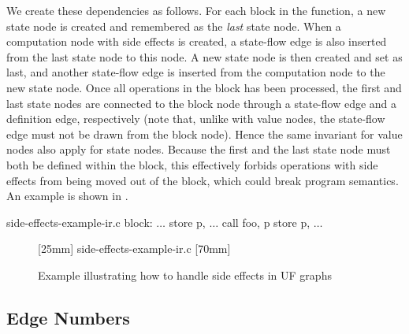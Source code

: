 We create these dependencies as follows.
%
For each \gls{block} in the \gls{function}, a new \gls{state node} is created
and remembered as the \emph{last} \gls{state node}.
%
When a \gls{computation node} with side effects is created, a \gls{state-flow
  edge} is also inserted from the last \gls{state node} to this \gls{node}.
%
A new \gls{state node} is then created and set as last, and another
\gls{state-flow edge} is inserted from the \gls{computation node} to the new
\gls{state node}.
%
Once all \glspl{operation} in the \gls{block} has been processed, the first and
last \glspl{state node} are connected to the \gls{block node} through a
\gls{state-flow edge} and a \gls{definition edge}, respectively (note that,
unlike with \glspl{value node}, the \gls{state-flow edge} must not be drawn from
the  \gls{block node}).
%
Hence the same invariant for \glspl{value node} also apply for \glspl{state
  node}.
%
Because the first and the last \gls{state node} must both be defined within the
\gls{block}, this effectively forbids \glspl{operation} with side effects from
being moved out of the \gls{block}, which could break \gls{program} semantics.
%
An example is shown in .
%
\begin{filecontents*}{side-effects-example-ir.c}
block:
  $\ldots$
  store p, $\ldots$
  call foo, p
  store p, $\ldots$
\end{filecontents*}
%
\begin{figure}
  \centering%
  \mbox{}%
  \hfill%
                [25mm]%
                {%
                                  {side-effects-example-ir.c}%
                }%
  \hfill%
                [70mm]%
                {%
                }%
  \hfill%
  \mbox{}

  \caption{Example illustrating how to handle side effects in UF graphs}%
\end{figure}


\subsection{Edge Numbers}

